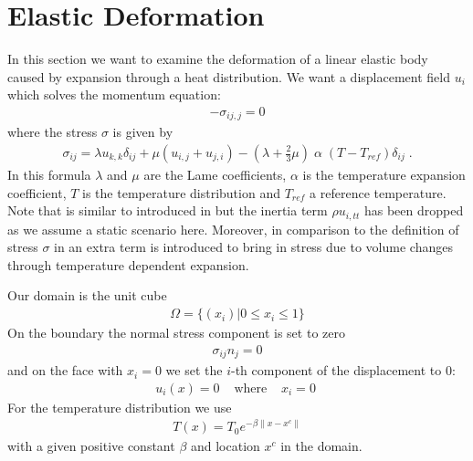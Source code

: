 
%
%
%


\section{Elastic Deformation}
\label{ELASTIC CHAP}
In this section we want to examine the deformation of a linear elastic body caused by expansion through a heat distribution.
We want a displacement field $u_{i}$ which solves the momentum
equation:
\begin{eqnarray}\label{HEATEDBLOCK general problem}
 - \sigma_{ij,j}=0
\end{eqnarray}
where the stress $\sigma$ is given by
\begin{eqnarray}\label{HEATEDBLOCK linear elastic}
 \sigma_{ij}= \lambda u_{k,k} \delta_{ij} + \mu ( u_{i,j} + u_{j,i})
 - (\lambda+\frac{2}{3} \mu)  \; \alpha  \;  (T-T_{ref})\delta_{ij} \;.
\end{eqnarray}
In this formula $\lambda$ and $\mu$ are the Lame coefficients, $\alpha$ is the
temperature expansion coefficient, $T$ is the temperature distribution and $T_{ref}$ a reference temperature.
Note that  is similar to 
introduced in  but the inertia term $\rho u_{i,tt}$
has been dropped as we assume a static scenario here.
Moreover, in comparison to the  definition of stress $\sigma$
in  an extra term is introduced to bring in
stress due to volume changes through temperature dependent expansion.

Our domain is the unit cube
\begin{eqnarray} \label{HEATEDBLOCK natural location}
\Omega=\{(x_{i}) | 0 \le x_{i} \le 1 \}
\end{eqnarray}
On the boundary the normal stress component is set to zero
\begin{eqnarray} \label{HEATEDBLOCK natural}
\sigma_{ij}n_{j}=0
\end{eqnarray}
and on the face with $x_{i}=0$ we set the $i$-th component of the displacement to $0$:
\begin{eqnarray} \label{HEATEDBLOCK constraint}
u_{i}(x)=0 & \mbox{ where } & x_{i}=0 \;
\end{eqnarray}
For the temperature distribution we use
\begin{eqnarray} \label{HEATEDBLOCK temperature}
T(x)= T_{0} e^{-\beta \|x-x^{c}\|}
\end{eqnarray}
with a given positive constant $\beta$ and location $x^{c}$ in the domain.

